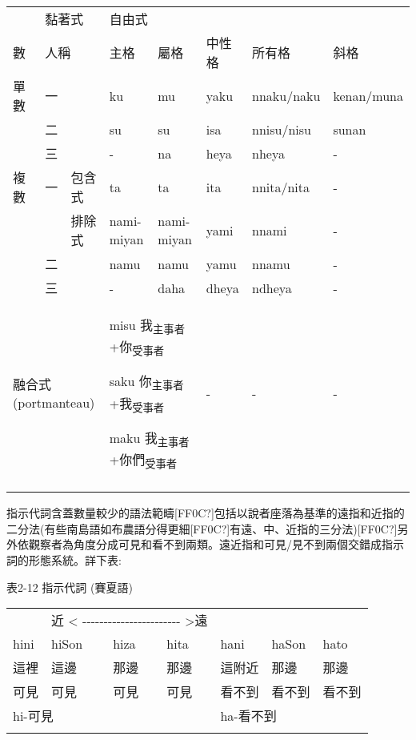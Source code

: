 \tabletail{}
\tablelasttail{}
\begin{tabularx}{\textwidth}{XXXXXXXX}
\lsptoprule

\multicolumn{3}{X}{ 人稱代名詞} & \multicolumn{2}{X}{ 黏著式} & \multicolumn{3}{X}{ 自由式}\\
\multicolumn{1}{X}{ 數} & \multicolumn{2}{X}{ 人稱} & 主格 & 屬格 & 中性格 & 所有格 & 斜格\\
\multicolumn{1}{X}{單數} & \multicolumn{2}{X}{一} & ku & mu & yaku & nnaku/naku & kenan/muna\\
& \multicolumn{2}{X}{二} & su & su & isa & nnisu/nisu & sunan\\
\hhline{~-------} & \multicolumn{2}{X}{三} & {}- & na & heya & nheya & {}-\\
\multicolumn{1}{X}{複數} & \multicolumn{1}{X}{一} & 包含式 & ta & ta & ita & nnita/nita & {}-\\
&  & 排除式 & nami-miyan & nami-miyan & yami & nnami & {}-\\
\hhline{~-------} & \multicolumn{2}{X}{二} & namu & namu & yamu & nnamu & {}-\\
\hhline{~-------} & \multicolumn{2}{X}{三} & {}- & daha & dheya & ndheya & {}-\\
\multicolumn{3}{X}{融合式 (portmanteau)} & \multicolumn{2}{X}{{\sffamily \textrm{misu 我}\textrm{\textsubscript{主事者}}\textrm{+你}\textrm{\textsubscript{受事者}}}

{\sffamily \textrm{saku 你}\textrm{\textsubscript{主事者}}\textrm{+我}\textrm{\textsubscript{受事者}}}

{\sffamily \textrm{maku 我}\textrm{\textsubscript{主事者}}\textrm{+你們}\textrm{\textsubscript{受事者}}}} & {}- & {}- & {}-\\
\lspbottomrule
\end{tabularx}
\textrm{指示代詞含蓋數量較少的語法範疇[FF0C?]包括以說者座落為基準的遠指和近指的二分法(有些南島語如布農語分得更細[FF0C?]有遠、中、近指的三分法)[FF0C?]另外依觀察者為角度分成可見和看不到兩類。遠近指和可見/見不到兩個交錯成指示詞的形態系統。詳下表:}

表2-12 指示代詞 (賽夏語)

\tablefirsthead{}

\tabletail{}
\tablelasttail{}
\begin{tabularx}{\textwidth}{XXXXXXX}
\lsptoprule

\multicolumn{4}{X}{近 < -{}-{}-{}-{}-{}-{}-{}-{}-{}-{}-{}-{}-{}-{}-{}-{}-{}-{}-{}-{}-{}-{}-{}-{}-{}-{}-{}-{}-{}-{}-{}-{}-{}-{}-{}- >遠} & \multicolumn{3}{X}{近 < -{}-{}-{}-{}-{}-{}-{}-{}-{}-{}-{}-{}-{}-{}-{}-{}-{}-{}-{}-{}-{}-{}- >遠}\\
hini & hiSon & hiza & hita & hani & haSon & hato\\
這裡 & 這邊 & 那邊 & 那邊 & 這附近 & 那邊 & 那邊\\
可見 & 可見 & 可見 & 可見 & 看不到 & 看不到 & 看不到\\
\multicolumn{4}{X}{hi-可見} & \multicolumn{3}{X}{ha-看不到}\\
\lspbottomrule
\end{tabularx}
